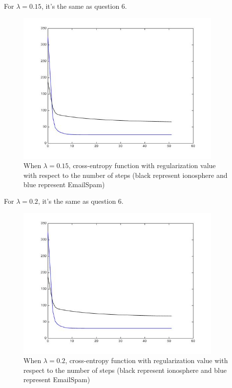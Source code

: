 \documentclass[11pt]{article}
\numberwithin{equation}{section}
\begin{document}
	For $\lambda = 0.15$, it's the same as question 6.
	\begin{figure} [H]
    	\centering 
    	\includegraphics[width=4in]{Q7015} 
    	\caption{When $\lambda = 0.15$, cross-entropy function with regularization value with respect to the number of steps (black represent ionosphere and blue represent EmailSpam)} 
    	\label{fig:side:a} 
	\end{figure}

	For $\lambda = 0.2$, it's the same as question 6.
	\begin{figure} [H]
    	\centering 
    	\includegraphics[width=4in]{Q702} 
    	\caption{When $\lambda = 0.2$, cross-entropy function with regularization value with respect to the number of steps (black represent ionosphere and blue represent EmailSpam)} 
    	\label{fig:side:a} 
	\end{figure}
	
\end{document}

